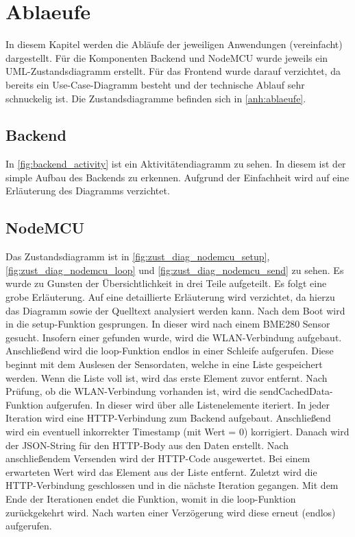 \section{Ablaeufe}\label{Ablaeufe}
In diesem Kapitel werden die Abläufe der jeweiligen Anwendungen (vereinfacht) dargestellt. Für die Komponenten
Backend und NodeMCU wurde jeweils ein UML-Zustandsdiagramm erstellt. Für das Frontend wurde darauf verzichtet, da bereits
ein Use-Case-Diagramm besteht und der technische Ablauf sehr schnuckelig ist. Die Zustandsdiagramme befinden sich in
\autoref{anh:ablaeufe}.
\subsection{Backend}
In \autoref{fig:backend_activity} ist ein Aktivitätendiagramm zu sehen. In diesem ist der simple Aufbau des Backends
zu erkennen. Aufgrund der Einfachheit wird auf eine Erläuterung des Diagramms verzichtet.
\subsection{NodeMCU}
Das Zustandsdiagramm ist in \autoref{fig:zust_diag_nodemcu_setup}, \autoref{fig:zust_diag_nodemcu_loop} und
\autoref{fig:zust_diag_nodemcu_send} zu sehen. Es wurde zu Gunsten der Übersichtlichkeit in drei Teile aufgeteilt.
Es folgt eine grobe Erläuterung.
Auf eine detaillierte Erläuterung wird verzichtet, da hierzu das Diagramm sowie der Quelltext analysiert werden kann.
Nach dem Boot wird in die setup-Funktion gesprungen.
In dieser wird nach einem BME280 Sensor gesucht.
Insofern einer gefunden wurde, wird die WLAN-Verbindung aufgebaut.
Anschließend wird die loop-Funktion endlos in einer Schleife aufgerufen.
Diese beginnt mit dem Auslesen der Sensordaten, welche in eine Liste gespeichert werden.
Wenn die Liste voll ist, wird das erste Element zuvor entfernt.
Nach Prüfung, ob die WLAN-Verbindung vorhanden ist, wird die sendCachedData-Funktion aufgerufen.
In dieser wird über alle Listenelemente iteriert.
In jeder Iteration wird eine HTTP-Verbindung zum Backend aufgebaut.
Anschließend wird ein eventuell inkorrekter Timestamp (mit Wert = 0) korrigiert.
Danach wird der JSON-String für den HTTP-Body aus den Daten erstellt.
Nach anschließendem Versenden wird der HTTP-Code ausgewertet.
Bei einem erwarteten Wert wird das Element aus der Liste entfernt.
Zuletzt wird die HTTP-Verbindung geschlossen und in die nächste Iteration gegangen.
Mit dem Ende der Iterationen endet die Funktion, womit in die loop-Funktion zurückgekehrt wird.
Nach warten einer Verzögerung wird diese erneut (endlos) aufgerufen.
